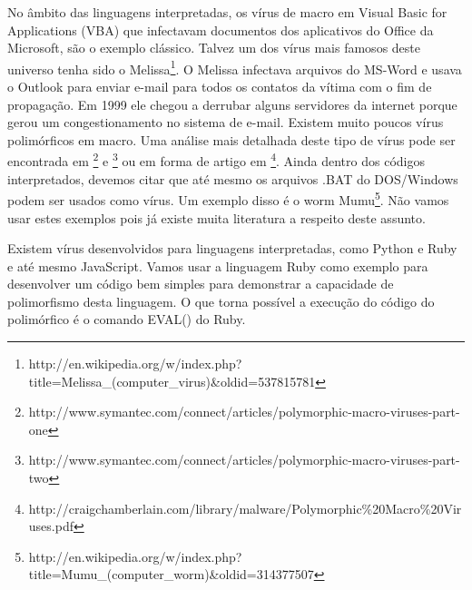 No âmbito das linguagens interpretadas, os vírus de macro em Visual Basic for Applications (VBA) que infectavam documentos dos aplicativos do Office da Microsoft, são o exemplo clássico. Talvez um dos vírus mais famosos deste universo tenha sido o Melissa\footnote{http://en.wikipedia.org/w/index.php?title=Melissa\_(computer\_virus)\&oldid=537815781}. O Melissa infectava arquivos do MS-Word e usava o Outlook para enviar e-mail para todos os contatos da vítima com o fim de propagação. Em 1999 ele chegou a derrubar alguns servidores da internet porque gerou um congestionamento no sistema de e-mail. Existem muito poucos vírus polimórficos em macro. Uma análise mais detalhada deste tipo de vírus pode ser encontrada em \footnote{http://www.symantec.com/connect/articles/polymorphic-macro-viruses-part-one} e \footnote{http://www.symantec.com/connect/articles/polymorphic-macro-viruses-part-two} ou em forma de artigo em \footnote{http://craigchamberlain.com/library/malware/Polymorphic\%20Macro\%20Viruses.pdf}. Ainda dentro dos códigos interpretados, devemos citar que até mesmo os arquivos .BAT do DOS/Windows podem ser usados como vírus. Um exemplo disso é o worm Mumu\footnote{http://en.wikipedia.org/w/index.php?title=Mumu\_(computer\_worm)\&oldid=314377507}. Não vamos usar estes exemplos pois já existe muita literatura a respeito deste assunto. 

Existem vírus desenvolvidos para linguagens interpretadas, como Python e Ruby e até mesmo JavaScript. Vamos usar a linguagem Ruby como exemplo para desenvolver um código bem simples para demonstrar a capacidade de polimorfismo desta linguagem. O que torna possível a execução do código do polimórfico é o comando EVAL() do Ruby. 
